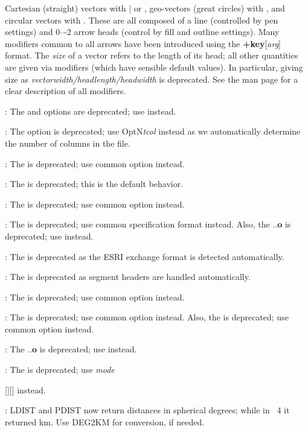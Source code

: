 \begin{enumerate}
{		Cartesian (straight) vectors with | or , geo-vectors (great circles) with , and circular vectors with .
		These are all composed of a line (controlled by pen settings) and 0–-2 arrow heads (control by fill and outline settings).
		Many modifiers common to all arrows have been introduced using the {\bf +key}[{\it arg}] format.  The {\it size}
		of a vector refers to the length of its head; all other quantities are given via modifiers (which have sensible default values).
		In particular, giving size as {\it vectorwidth/headlength/headwidth} is deprecated.
		See the  man page for a clear description of all modifiers.
	\item {}: The  and  options are deprecated; use  instead.
	\item {}: The  option is deprecated; use Opt{N}{\it tcol} instead
		as we automatically determine the number of columns in the file.
	\item {}: The  is deprecated; use common option  instead.
	\item {}: The  is deprecated; this is the default behavior.
	\item {}: The  is deprecated; use common option  instead.
	\item {}: The  is deprecated; use common specification format  instead. Also,
		the ..{\bf o} is deprecated; use  instead.
	\item {}: The  is deprecated as the ESRI exchange format is detected automatically.
	\item {}: The  is deprecated as segment headers are handled automatically.
	\item {}: The  is deprecated; use common option  instead.
	\item {}: The  is deprecated; use common option  instead.  Also,
		the  is deprecated; use common option  instead.
	\item {}: The ..{\bf o} is deprecated; use  instead.
	\item {}: The  is deprecated; use \it mode}[][] instead.
	\item {}: LDIST and PDIST now return distances in spherical degrees; while in \gmt\ 4 it returned km.  Use DEG2KM for conversion, if needed.

\end{enumerate}
